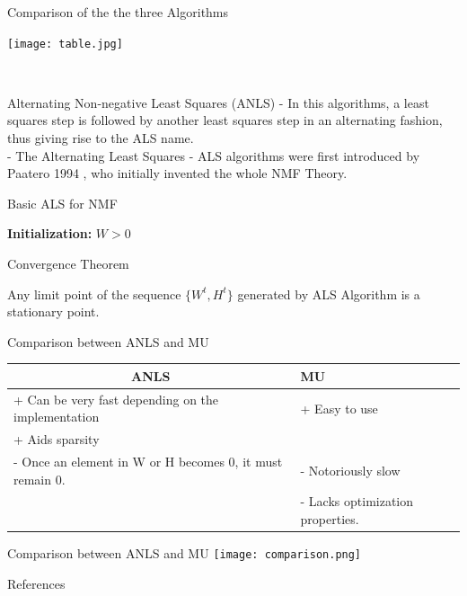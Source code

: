 \documentclass[aspectratio=169]{beamer}
\begin{document}
\begin{frame}{Comparison of the the three Algorithms}
    \begin{center}\texttt{[image: table.jpg]}\end{center}\\
\end{frame}

\begin{frame}{Alternating Non-negative Least Squares (ANLS)}
    - In this algorithms, a least squares step is followed by another least squares step in an alternating fashion, thus giving rise to the ALS name.\\
    - The Alternating Least Squares - ALS algorithms were first introduced by Paatero 1994 , 
    who initially invented the whole NMF Theory.
    \begin{algorithm}[H]
        \caption{Basic ALS for NMF}
        \textbf{Initialization:} $W > 0$\;
    \end{algorithm}
\end{frame}

\begin{frame}{Convergence Theorem}
    \begin{theorem}
        Any limit point of the sequence $\{W^{t} , H^{t}\}$ generated by ALS Algorithm  is a stationary point.
    \end{theorem}
    \end{frame}
    \begin{frame}{Comparison between ANLS and MU}
\begin{tabular}{|l|l|}
    \hline
    \multicolumn{1}{|c|}{ANLS} & MU \\
    \hline
    + Can be very fast depending on the implementation & + Easy to use  \\
    + Aids sparsity &  \\
    \hline
    -  Once an element in W or H becomes 0, it must remain 0. & - Notoriously slow \\
      & - Lacks optimization properties.\\
    \hline
\end{tabular}   
\end{frame}
\begin{frame}{Comparison between ANLS and MU}
    \texttt{[image: comparison.png]}\\
\end{frame}

\begin{frame}[allowframebreaks]{References}
    \nocite{*}
    
    
\end{frame}
\end{document}
